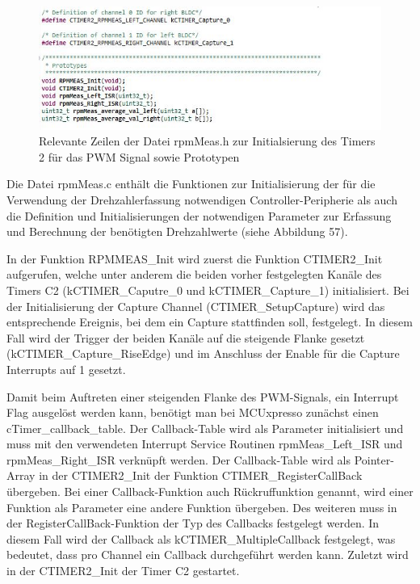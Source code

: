 \begin{figure}[H] %
\includegraphics[width=.80\textwidth]{sec4/images/rpm_defines} 
\centering
\captionsetup{width=.95\textwidth}
\caption[rpm\_defines]{Relevante Zeilen der Datei \glqq{}rpmMeas.h\grqq{} zur Initialsierung des Timers 2 für das PWM Signal sowie Prototypen }\centering
\label{fig:Schaltungsaufbau}
\end{figure}

Die Datei \glqq{}rpmMeas.c\grqq{} enthält die Funktionen zur Initialisierung der für die Verwendung der Drehzahlerfassung notwendigen Controller-Peripherie als auch die Definition und Initialisierungen der notwendigen Parameter zur Erfassung und Berechnung der benötigten Drehzahlwerte (siehe Abbildung 57).  \vspace{11pt}


In der Funktion RPMMEAS\_Init wird zuerst die Funktion CTIMER2\_Init aufgerufen, welche unter anderem die beiden vorher festgelegten Kanäle des Timers C2 (\glqq{}kCTIMER\_Caputre\_0\grqq{} und \glqq{}kCTIMER\_Capture\_1\grqq{}) initialisiert. Bei der Initialisierung der Capture Channel (CTIMER\_SetupCapture) wird das entsprechende Ereignis, bei dem ein Capture stattfinden soll, festgelegt. In diesem Fall wird der Trigger der beiden Kanäle auf die steigende Flanke gesetzt (\glqq{}kCTIMER\_Capture\_RiseEdge\grqq{}) und im Anschluss der Enable für die Capture Interrupts auf 1 gesetzt. \vspace{11pt}

Damit beim Auftreten einer steigenden Flanke des PWM-Signals, ein Interrupt Flag ausgelöst werden kann, benötigt man bei MCUxpresso zunächst einen cTimer\_callback\_table. Der Callback-Table wird als Parameter initialisiert und muss mit den verwendeten Interrupt Service Routinen rpmMeas\_Left\_ISR und rpmMeas\_Right\_ISR verknüpft werden. Der Callback-Table wird als Pointer-Array in der CTIMER2\_Init der Funktion CTIMER\_RegisterCallBack übergeben. Bei einer Callback-Funktion auch Rückruffunktion genannt, wird einer Funktion als Parameter eine andere Funktion übergeben. Des weiteren muss in der RegisterCallBack-Funktion der Typ des Callbacks festgelegt werden. In diesem Fall wird der Callback als \glqq{}kCTIMER\_MultipleCallback\grqq{} festgelegt, was bedeutet, dass pro Channel ein Callback durchgeführt werden kann. Zuletzt wird in der CTIMER2\_Init der Timer C2 gestartet.\vspace{11pt}

